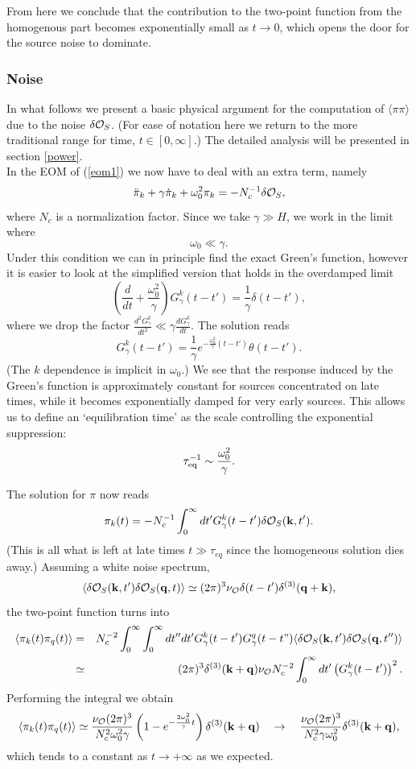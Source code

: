 \documentclass[11pt,amsmath,floats,floatfix,nofootinbib,secnumarabic, superscriptaddress, tightenlines]{revtex4}
\newcommand{\beq}{\begin{equation}}
\newcommand{\eeq}{\end{equation}}
\newcommand{\bea}{\begin{eqnarray}}
\newcommand{\eea}{\end{eqnarray}}
\newcommand{\nn}{\nonumber}
\newcommand{\calo}{{\cal O}}
\begin{document}
From here we conclude that the contribution to the two-point function from the homogenous part becomes exponentially small as $t \to 0$, which opens the door for the source noise to dominate. 

\subsubsection{Noise}\label{noise}

In what follows we present a basic physical argument for the computation of $\langle \pi \pi \rangle$ due to the noise $\delta\calo_S$. (For ease of notation here we return to the more traditional range for time, $t \in [0,\infty]$.) The detailed analysis will be presented in section \ref{power}.\\

In the EOM of (\ref{eom1}) we now have to deal with an extra term, namely
\beq
\ddot \pi_k +\gamma\dot\pi_k + \omega_0^2 \pi_k =- N^{-1}_c \delta\calo_S,
\eeq
where $N_c$ is a normalization factor. Since we take $\gamma \gg H$, we work in the limit where
\beq
\omega_0 \ll \gamma .
\eeq
Under this condition we can in principle find the exact Green's function, however it is easier to look at the simplified version that holds in the overdamped limit
 \beq
\left(\frac{d}{dt} +\frac{\omega_0^2}{\gamma} \right) G^k_\gamma(t-t') = \frac{1}{\gamma} \delta(t-t'),
\eeq
where we drop the factor $\frac{d^2 G^k_\gamma}{dt^2} \ll \gamma \frac{d G^k_\gamma}{dt}.$ The solution reads 
\beq
G^k_\gamma(t-t') = \frac{1}{\gamma} e^{- \frac{\omega_0^2}{\gamma}(t-t')}\theta(t-t').
\eeq
(The $k$ dependence is implicit in $\omega_0$.) We see that the response induced by the Green's function is approximately constant for sources concentrated on late times, while it becomes exponentially damped for very early sources. This allows us to define an `equilibration time' as the scale controlling the exponential suppression:
\beq
\tau^{-1}_{\rm eq} \sim \frac{\omega_0^2}{\gamma} .
\eeq

The solution for $\pi$ now reads
\beq
\label{piknoise}
\pi_k(t) =- N^{-1}_c \int_0^\infty dt' G^k_\gamma(t-t')\delta\calo_S({\bf{k}},t').
\eeq
(This is all what is left at late times $t\gg\tau_{eq}$ since the homogeneous solution dies away.)
Assuming a white noise spectrum,
\beq\label{eq:localnoise}
\langle \delta\calo_S({\bf{k}},t')\delta\calo_S({\bf{q}},t)\rangle \simeq (2\pi)^3 \nu_{\calo} \delta(t-t') \delta^{(3)}({\bf q}+{\bf k}),
\eeq
the two-point function turns into
\bea
\langle \pi_k(t)\pi_q(t) \rangle &=& N_c^{-2} \int_0^\infty \int_0^\infty dt'' dt' G^k_\gamma(t-t')G^q_\gamma(t-t")\langle \delta\calo_S({\bf{k}},t')\delta\calo_S({\bf{q}},t'')\rangle \\
&\simeq& (2\pi)^3\delta^{(3)}({\bf k}+{\bf q}) \nu_{\calo} N_c^{-2} \int_0^\infty dt' \left(G^k_\gamma(t-t')\right)^2.\nn
\eea
Performing the integral we obtain
\beq
\label{pikq}
\langle \pi_k(t) \pi_q(t) \rangle \simeq \frac{\nu_{\calo} (2\pi)^3}{N_c^2\omega_0^2\gamma} \left(1-  e^{- \frac{2\omega_0^2}{\gamma}t}\right)\delta^{(3)}({\bf k}+{\bf q}) \quad\to\quad \frac{\nu_{\calo}(2\pi)^3}{N_c^2\gamma\omega_0^2}\delta^{(3)}({\bf k}+{\bf q}),
\eeq
which tends to a constant as $t\to +\infty$ as we expected.
\end{document}
